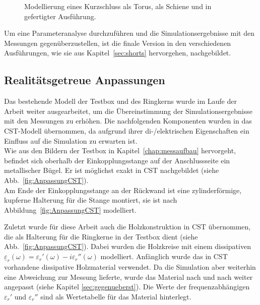             \begin{figure}[htb]
                \centering
                \hspace{0.01\textwidth}
                \hspace{0.01\textwidth}
                \caption{Modellierung eines Kurzschluss \protect{} als Torus, \protect{} als Schiene und \protect{} in gefertigter Ausführung.}
                \label{fig:KSCST}
            \end{figure}
        
        Um eine Parameteranalyse durchzuführen und die Simulationsergebnisse mit den Messungen gegenüberzustellen, ist die finale Version in den verschiedenen Ausführungen, wie sie aus Kapitel~\ref{sec:shorts} hervorgehen, nachgebildet.
        
        \subsection{Realitätsgetreue Anpassungen}
        Das bestehende Modell der Testbox und des Ringkerns wurde im Laufe der Arbeit weiter ausgearbeitet, um die Übereinstimmung der Simulationsergebnisse mit den Messungen zu erhöhen. Die nachfolgenden Komponenten wurden in das CST-Modell übernommen, da aufgrund ihrer di-/elektrischen Eigenschaften ein Einfluss auf die Simulation zu erwarten ist.\\
        Wie aus den Bildern der Testbox in Kapitel~\ref{chap:messaufbau} hervorgeht, befindet sich oberhalb der Einkopplungsstange auf der Anschlussseite ein metallischer Bügel. Er ist möglichst exakt in CST nachgebildet (siehe Abb.~\ref{fig:AnpassungCST}).\\
        Am Ende der Einkopplungsstange an der Rückwand ist eine zylinderförmige, kupferne Halterung für die Stange montiert, sie ist nach Abbildung~\ref{fig:AnpassungCST} modelliert.
        \par
        Zuletzt wurde für diese Arbeit auch die Holzkonstruktion in CST übernommen, die als Halterung für die Ringkerne in der Testbox dient (siehe Abb.~\ref{fig:AnpassungCST}). Dabei wurden die Holzkreise mit einem dissipativen $\underline{\varepsilon}_r(\omega) = \varepsilon_r'(\omega)-i\varepsilon_r''(\omega)$ modelliert. Anfänglich wurde das in CST vorhandene dissipative Holzmaterial verwendet. Da die Simulation aber weiterhin eine Abweichung zur Messung lieferte, wurde das Material nach und nach weiter angepasst (siehe Kapitel \ref{sec:gegenueberst}). Die Werte der frequenzabhängigen $\varepsilon_r'$ und $\varepsilon_r''$ sind als Wertetabelle für das Material hinterlegt.
        
